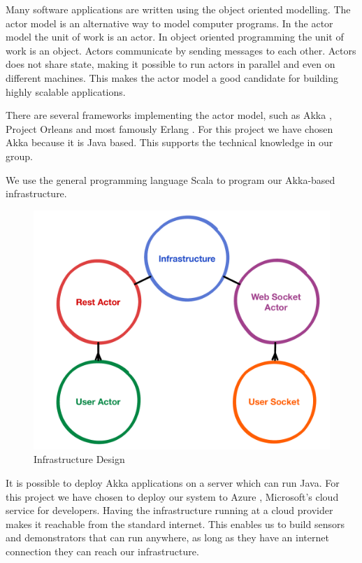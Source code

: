 \documentclass{sigchi}
\begin{document}
Many software applications are written using the object oriented modelling.
The actor model is an alternative way to model computer programs.
In the actor model the unit of work is an actor.
In object oriented programming the unit of work is an object.
Actors communicate by sending messages to each other.
Actors does not share state, making it possible to run actors in parallel and even on different machines.
This makes the actor model a good candidate for building highly scalable applications.

There are several frameworks implementing the actor model, such as Akka \cite{akka}, Project Orleans \cite{orleans} and most famously Erlang \cite{erlang}.
For this project we have chosen Akka because it is Java based.
This supports the technical knowledge in our group.

We use the general programming language Scala \cite{scala} to program our Akka-based infrastructure.


\begin{figure}[H]
  \centering
  \includegraphics[width=\columnwidth]{figures/infrastructure_design.pdf}
  \caption{Infrastructure Design}
  \label{fig:infrastructure}
\end{figure}

It is possible to deploy Akka applications on a server which can run Java.
For this project we have chosen to deploy our system to Azure \cite{azure}, Microsoft's cloud service for developers.
Having the infrastructure running at a cloud provider makes it reachable from the standard internet.
This enables us to build sensors and demonstrators that can run anywhere, as long as they have an internet connection they can reach our infrastructure.
\end{document}
